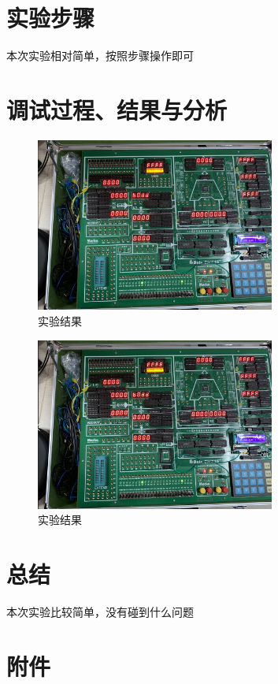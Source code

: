 \documentclass[a4paper,10pt,UTF8]{paper}
\numberwithin{equation}{section}
\numberwithin{figure}{section}
\begin{document}
\section{实验步骤}

本次实验相对简单，按照步骤操作即可

\section{调试过程、结果与分析}

\begin{figure}[h]
	\centering
	\includegraphics[width=0.7\textwidth]{3.png}
	\caption{实验结果}
\end{figure}

\begin{figure}[h]
	\centering
	\includegraphics[width=0.7\textwidth]{4.png}
	\caption{实验结果}
\end{figure}


\section{总结}

本次实验比较简单，没有碰到什么问题

\section{附件}
\end{document}
